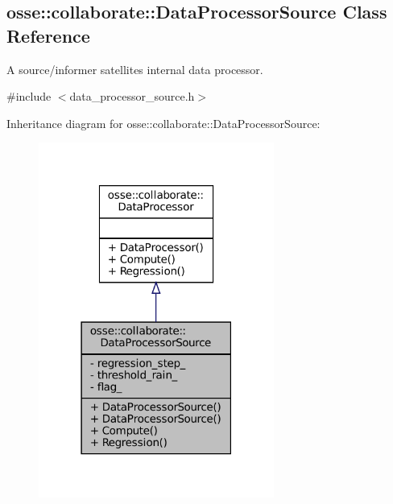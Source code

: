 \hypertarget{classosse_1_1collaborate_1_1_data_processor_source}{}\subsection{osse\+:\+:collaborate\+:\+:Data\+Processor\+Source Class Reference}
\label{classosse_1_1collaborate_1_1_data_processor_source}


A source/informer satellite\textquotesingle{}s internal data processor.  




{\ttfamily \#include $<$data\+\_\+processor\+\_\+source.\+h$>$}



Inheritance diagram for osse\+:\+:collaborate\+:\+:Data\+Processor\+Source\+:
\nopagebreak
\begin{figure}[H]
\begin{center}
\leavevmode
\includegraphics[width=219pt]{classosse_1_1collaborate_1_1_data_processor_source__inherit__graph}
\end{center}
\end{figure}
